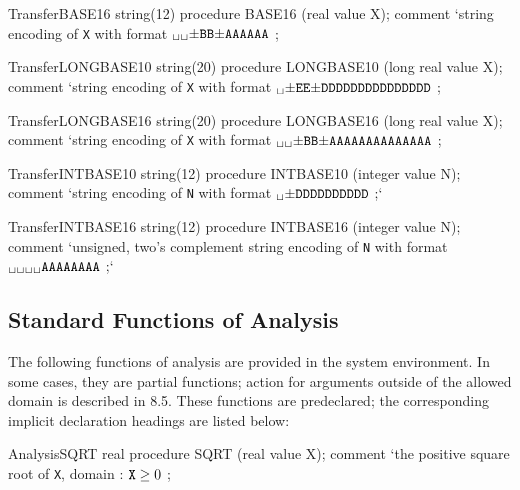 \documentclass[a4paper]{article}
\begin{document}
\begin{ProcedureDeclaration}{Transfer}{BASE16}
string(12) procedure BASE16 (real value X);
comment `\rm string encoding of {\tt X} with format ${\tt{_\sqcup}{_\sqcup}{\pm}BB{\pm}AAAAAA}$ ;
\end{ProcedureDeclaration}

\begin{ProcedureDeclaration}{Transfer}{LONGBASE10}
string(20) procedure LONGBASE10 (long real value X);
comment `\rm string encoding of {\tt X} with format ${\tt{_\sqcup}{\pm}EE{\pm}DDDDDDDDDDDDDDD}$ ;
\end{ProcedureDeclaration}

\begin{ProcedureDeclaration}{Transfer}{LONGBASE16}
string(20) procedure LONGBASE16 (long real value X);
comment `\rm string encoding of {\tt X} with format ${\tt{_\sqcup}{_\sqcup}{\pm}BB{\pm}AAAAAAAAAAAAAA}$ ;
\end{ProcedureDeclaration}

\begin{ProcedureDeclaration}{Transfer}{INTBASE10}
string(12) procedure INTBASE10 (integer value N);
comment `\rm string encoding of {\tt N} with format ${\tt{_\sqcup}{\pm}DDDDDDDDDD}$ ;`
\end{ProcedureDeclaration}

\begin{ProcedureDeclaration}{Transfer}{INTBASE16}
string(12) procedure INTBASE16 (integer value N);
comment `\rm  unsigned, two's complement string encoding of {\tt N} with format \\ ${\tt{_\sqcup}{_\sqcup}{_\sqcup}{_\sqcup}AAAAAAAA}$ ;`
\end{ProcedureDeclaration}


\subsection{Standard Functions of Analysis}
\label{Standard Functions of Analysis}

The following functions of analysis are provided in the system
environment. In some cases, they are partial functions; action for
arguments outside of the allowed domain is described in 8.5. These
functions are predeclared; the corresponding implicit declaration
headings are listed below:

\begin{ProcedureDeclaration}{Analysis}{SQRT}
real procedure SQRT (real value X);
comment `\rm the positive square root of {\tt X}, domain : ${\tt X} \ge 0$ ;
\end{ProcedureDeclaration}
\end{document}

